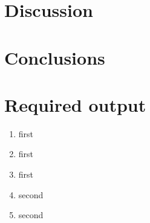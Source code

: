\documentclass{article}
\begin{document}
\section{Discussion}

\section{Conclusions}

\appendix 

\section{Required output}

\begin{enumerate}
    \item first
    \item first
    \item first
    \item second
    \item second
\end{enumerate}
\end{document}
